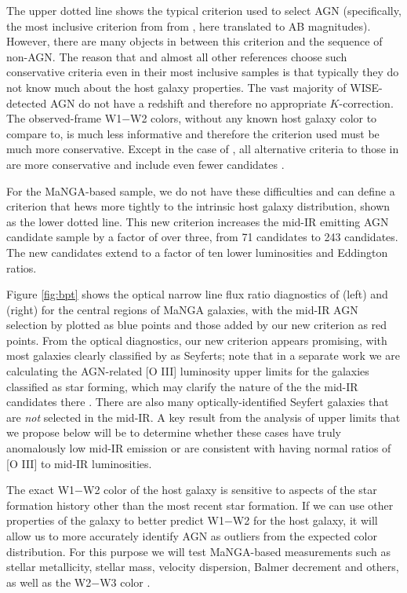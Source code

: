 \documentclass[12pt, preprint]{hacked-aastex}
\begin{document}
The upper dotted line shows the typical criterion used to select AGN
(specifically, the most inclusive criterion from from \cite{assef18a},
here translated to AB magnitudes). However, there are many objects in
between this criterion and the sequence of non-AGN. The reason that
\cite{assef18a} and almost all other references choose such
conservative criteria even in their most inclusive samples is that
typically they do not know much about the host galaxy properties.  The
vast majority of WISE-detected AGN do not have a redshift and
therefore no appropriate $K$-correction. The observed-frame W1$-$W2
colors, without any known host galaxy color to compare to, is much
less informative and therefore the criterion used must be much more
conservative. Except in the case of \cite{hviding22a}, all alternative
criteria to those in \cite{assef18a} are more conservative and include
even fewer candidates \cite{jarrett11a,stern12a}.

For the MaNGA-based sample, we do not have these difficulties and can
define a criterion that hews more tightly to the intrinsic host galaxy
distribution, shown as the lower dotted line. This new criterion
increases the mid-IR emitting AGN candidate sample by a factor of over
three, from 71 candidates to 243 candidates. The new candidates extend
to a factor of ten lower luminosities and Eddington ratios.

Figure \ref{fig:bpt} shows the optical narrow line flux ratio
diagnostics of \cite{veilleux87a} (left) and \cite{baldwin81a} (right)
for the central regions of MaNGA galaxies, with the mid-IR AGN
selection by \cite{assef18a} plotted as blue points and those added by
our new criterion as red points. From the optical diagnostics, our new
criterion appears promising, with most galaxies clearly classified by
\cite{baldwin81a} as Seyferts; note that in a separate work we are
calculating the AGN-related [O III] luminosity upper limits for the
galaxies classified as star forming, which may clarify the nature of
the the mid-IR candidates there \cite{liu21a}. There are also many
optically-identified Seyfert galaxies that are {\it not} selected in
the mid-IR. A key result from the analysis of upper limits that we
propose below will be to determine whether these cases have truly
anomalously low mid-IR emission or are consistent with having normal
ratios of [O III] to mid-IR luminosities.

The exact W1$-$W2 color of the host galaxy is sensitive to aspects of
the star formation history other than the most recent star
formation. If we can use other properties of the galaxy to better
predict W1$-$W2 for the host galaxy, it will allow us to more
accurately identify AGN as outliers from the expected color
distribution.  For this purpose we will test MaNGA-based measurements
such as stellar metallicity, stellar mass, velocity dispersion, Balmer
decrement and others, as well as the W2$-$W3 color \cite{hviding22a}.
\end{document}
